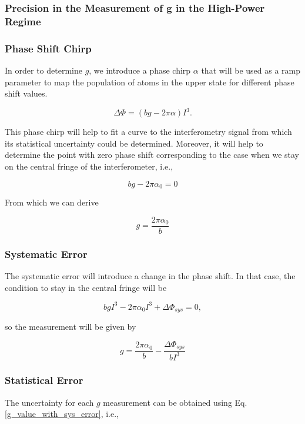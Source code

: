 \documentclass{article}
\begin{document}
\subsubsection{Precision in the Measurement of g in the High-Power Regime}


\subsubsection{Phase Shift Chirp}
In order to determine $g$, we introduce a phase chirp $\alpha$ that will be used as a ramp parameter to map the population of atoms in the upper state for different phase shift values. 

\begin{equation}
    \Delta \Phi = (b g  - 2\pi \alpha) I^3.
\end{equation}

This phase chirp will help to fit a curve to the interferometry signal from which its statistical uncertainty could be determined. Moreover, it will help to determine the point with zero phase shift corresponding to the case when we stay on the central fringe of the interferometer, i.e.,

\begin{equation}
    b g  - 2\pi \alpha_{0} = 0
\end{equation}

From which we can derive

\begin{equation}
    g = \frac{2\pi \alpha_{0}}{b}
\end{equation}

\subsubsection{Systematic Error}
The systematic error will introduce a change in the phase shift. In that case, the condition to stay in the central fringe will be

\begin{equation}
    b g I^3 - 2\pi \alpha_{0} I^3 + \Delta \Phi_{sys}= 0,
\end{equation}

so the measurement will be given by

\begin{equation}\label{g_value_with_sys_error}
    g = \frac{2\pi \alpha_{0}}{b} - \frac{\Delta \Phi_{sys}}{b I^3}
\end{equation}

\subsubsection{Statistical Error}
The uncertainty for each $g$ measurement can be obtained using Eq. \ref{g_value_with_sys_error}, i.e.,
\end{document}

